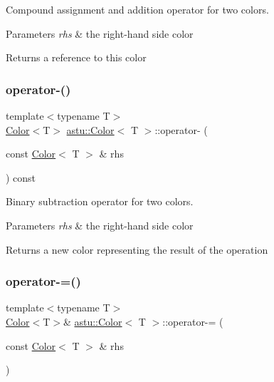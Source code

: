 Compound assignment and addition operator for two colors.


\begin{DoxyParams}{Parameters}
{\em rhs} & the right-\/hand side color \\
\hline
\end{DoxyParams}
\begin{DoxyReturn}{Returns}
a reference to this color 
\end{DoxyReturn}
\mbox{\label{classastu_1_1Color_a2d512332791d4187ecde51771648cb9c}} 
\subsubsection{\texorpdfstring{operator-\/()}{operator-()}}
{\footnotesize\ttfamily template$<$typename T$>$ \\
\hyperlink{classastu_1_1Color}{Color}$<$T$>$ \hyperlink{classastu_1_1Color}{astu\+::\+Color}$<$ T $>$\+::operator-\/ (\begin{DoxyParamCaption}\item[{const \hyperlink{classastu_1_1Color}{Color}$<$ T $>$ \&}]{rhs }\end{DoxyParamCaption}) const\hspace{0.3cm}{\ttfamily [inline]}}

Binary subtraction operator for two colors.


\begin{DoxyParams}{Parameters}
{\em rhs} & the right-\/hand side color \\
\hline
\end{DoxyParams}
\begin{DoxyReturn}{Returns}
a new color representing the result of the operation 
\end{DoxyReturn}
\mbox{\label{classastu_1_1Color_add622a013366f3f07eee482493c2c158}} 
\subsubsection{\texorpdfstring{operator-\/=()}{operator-=()}}
{\footnotesize\ttfamily template$<$typename T$>$ \\
\hyperlink{classastu_1_1Color}{Color}$<$T$>$\& \hyperlink{classastu_1_1Color}{astu\+::\+Color}$<$ T $>$\+::operator-\/= (\begin{DoxyParamCaption}\item[{const \hyperlink{classastu_1_1Color}{Color}$<$ T $>$ \&}]{rhs }\end{DoxyParamCaption})\hspace{0.3cm}{\ttfamily [inline]}}

